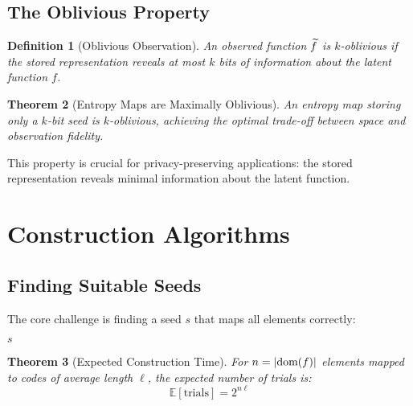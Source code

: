 \documentclass[11pt,final,hidelinks]{article}
\newtheorem{theorem}{Theorem}[section]
\newtheorem{definition}[theorem]{Definition}
\begin{document}
\subsection{The Oblivious Property}

\begin{definition}[Oblivious Observation]
An observed function $\widetilde{f}$ is $k$-oblivious if the stored representation reveals at most $k$ bits of information about the latent function $f$.
\end{definition}

\begin{theorem}[Entropy Maps are Maximally Oblivious]
An entropy map storing only a $k$-bit seed is $k$-oblivious, achieving the optimal trade-off between space and observation fidelity.
\end{theorem}

This property is crucial for privacy-preserving applications: the stored representation reveals minimal information about the latent function.

\section{Construction Algorithms}

\subsection{Finding Suitable Seeds}

The core challenge is finding a seed $s$ that maps all elements correctly:

\begin{algorithm}[H]
\SetAlgoLined
{}
\Return $s$\;
\caption{Entropy Map Construction}
\end{algorithm}

\begin{theorem}[Expected Construction Time]
For $n = \lvert\text{dom}(f)\rvert$ elements mapped to codes of average length $\ell$, the expected number of trials is:
\begin{equation}
\mathbb{E}[\text{trials}] = 2^{n\ell}
\end{equation}
\end{theorem}
\end{document}
